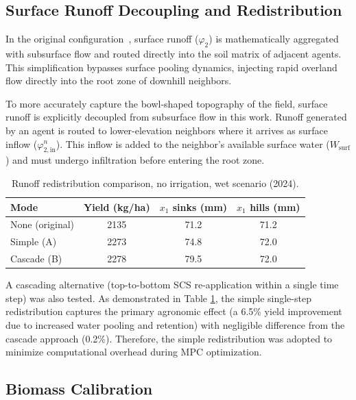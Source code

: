 \subsection{Surface Runoff Decoupling and Redistribution}
\label{sec:runoff}

In the original configuration~\cite{Lopezjimenez2024}, surface runoff ($\varphi_2$) is mathematically aggregated with subsurface flow and routed directly into the soil matrix of adjacent agents. This simplification bypasses surface pooling dynamics, injecting rapid overland flow directly into the root zone of downhill neighbors. 

To more accurately capture the bowl-shaped topography of the field, surface runoff is explicitly decoupled from subsurface flow in this work. Runoff generated by an agent is routed to lower-elevation neighbors where it arrives as surface inflow ($\varphi_{2,\text{in}}^n$). This inflow is added to the neighbor's available surface water ($W_{\text{surf}}$) and must undergo infiltration before entering the root zone.

\begin{table}[H]
\centering
\caption{Runoff redistribution comparison, no irrigation, wet scenario (2024).}
\label{tab:runoff}
\begin{tabular}{lccc}
\toprule
\textbf{Mode} & \textbf{Yield (kg/ha)} & \textbf{$x_1$ sinks (mm)} & \textbf{$x_1$ hills (mm)} \\
\midrule
None (original) & 2135 & 71.2 & 71.2 \\
Simple (A) & 2273 & 74.8 & 72.0 \\
Cascade (B) & 2278 & 79.5 & 72.0 \\
\bottomrule
\end{tabular}
\end{table}

A cascading alternative (top-to-bottom SCS re-application within a single time step) was also tested. As demonstrated in Table \ref{tab:runoff}, the simple single-step redistribution captures the primary agronomic effect (a 6.5\% yield improvement due to increased water pooling and retention) with negligible difference from the cascade approach (0.2\%). Therefore, the simple redistribution was adopted to minimize computational overhead during MPC optimization.

\subsection{Biomass Calibration}

